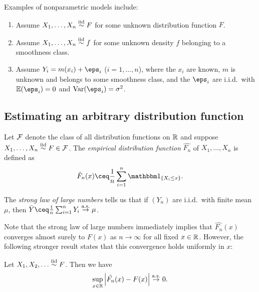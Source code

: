 \begin{example}
    Examples of nonparametric models include: 
    \begin{enumerate}
        \item Assume $X_1, \dotsc, X_n \overset{\mathrm{iid}}{\sim} F$ for some unknown distribution function $F$. 
        \item Assume $X_1, \dotsc, X_n \overset{\mathrm{iid}}{\sim} f$ for some unknown density $f$ belonging to a smoothness class.
        \item Assume $Y_i = m(x_i) + \eps_i$ ($i = 1, \dotsc, n$), where the $x_i$ are known, $m$ is unknown and belongs to some smoothness class, and the $\eps_i$ are i.i.d.\ with $\EE (\eps_i) = 0$ and $\Var(\eps_i) = \sigma^2$. 
    \end{enumerate}
\end{example}

\subsection{Estimating an arbitrary distribution function}
\begin{definition}
    Let $\mathcal F$ denote the class of all distribution functions on $\mathbb R$ and suppose $X_1, \dotsc, X_n \overset{\mathrm{iid}}{\sim} F \in \mathcal F$. The \emph{empirical distribution function} $\hat{F_n}$ of $X_1, \dotsc, X_n$ is defined as
    \[
    \hat F_n(x) \ceq \frac1n \sum_{i=1}^n \ind_\qty{X_i \leq x}.
    \]
\end{definition}

\begin{recap}
    The \emph{strong law of large numbers} tells us that if $(Y_n)$ are i.i.d.\ with finite mean $\mu$, then $\bar{Y} \ceq \frac1n \sum_{i=1}^n Y_i \toas \mu$. 
\end{recap}

Note that the strong law of large numbers immediately implies that $\hat{F_n}(x)$ converges almost surely to $F(x)$ as $n \to \infty$ for all fixed $x \in \mathbb R$. However, the following stronger result states that this convergence holds uniformly in $x$: 

\begin{theorem} \label{thm:GC}
    Let $X_1, X_2, \dotsc \overset{\mathrm{iid}}{\sim} F$. Then we have 
    \[
    \sup_{x \in \mathbb R} \abs{\hat{F_n}(x) - F(x)}\overset{\mathrm{a.s.}}{\to} 0. 
    \]
\end{theorem}

